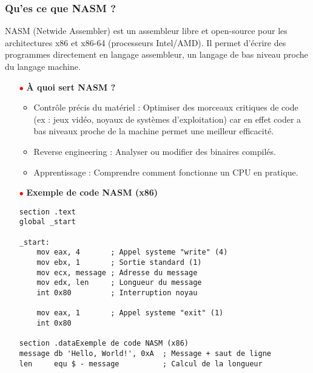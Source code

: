 \documentclass{article}
\begin{document}
\subsubsection*{Qu'es ce que NASM ?}
\begin{figure}[h]
    \label{fig:nasm}
\end{figure}
NASM (Netwide Assembler) est un assembleur libre et open-source pour les architectures x86 et x86-64 (processeurs Intel/AMD). Il permet d'écrire des programmes directement en langage assembleur, un langage de bas niveau proche du langage machine. \\
\begin{itemize}
    \item[\textbf{\textcolor{red}{$\bullet$}}] \textbf{À quoi sert NASM ?}
    \begin{itemize}
        \item Contrôle précis du matériel : Optimiser des morceaux critiques de code (ex : jeux vidéo, noyaux de systèmes d’exploitation) car en effet coder a bas niveaux proche de la machine permet une meilleur efficacité.
        \item Reverse engineering : Analyser ou modifier des binaires compilés.
        \item Apprentissage : Comprendre comment fonctionne un CPU en pratique.
    \end{itemize}
    
    \item[\textbf{\textcolor{red}{$\bullet$}}] \textbf{Exemple de code NASM (x86)}
    
\begin{lstlisting}[language=ld]
    section .text
global _start

_start:
    mov eax, 4       ; Appel systeme "write" (4)
    mov ebx, 1       ; Sortie standard (1)
    mov ecx, message ; Adresse du message
    mov edx, len     ; Longueur du message
    int 0x80         ; Interruption noyau

    mov eax, 1       ; Appel systeme "exit" (1)
    int 0x80

section .dataExemple de code NASM (x86)
message db 'Hello, World!', 0xA  ; Message + saut de ligne
len     equ $ - message          ; Calcul de la longueur
    \end{lstlisting}
\end{itemize}

\newpage
\end{document}
